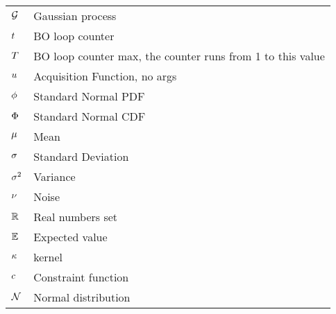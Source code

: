 \documentclass[]{report}
\begin{document}
\begin{table}
\begin{tabular}{ll}
		 $\mathcal{G}$ & Gaussian process \\
		$t$ & BO loop counter \\
		$T$ & BO loop counter max, the counter runs from 1 to this value \\
		$u$ & Acquisition Function, no args \\
		$\phi$ & Standard Normal PDF \\
		$\Phi$ & Standard Normal CDF \\
		$\mu$ & Mean \\
		$\sigma$ & Standard Deviation \\
		$\sigma^2$ & Variance \\
		$\nu$ & Noise \\
		$\mathbb{R}$ & Real numbers set \\
		$\mathbb{E}$ & Expected value \\
		$\kappa$ & kernel \\
		$c$ & Constraint function \\
		$\mathcal{N}$ & Normal distribution \\
		\bottomrule
\end{tabular}
\end{table}
\end{document}
